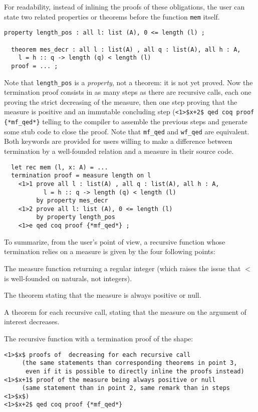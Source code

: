 For readability, instead of inlining the proofs of these obligations,
the user can state two related properties or theorems before the
function {\tt mem} itself.

\noindent
{\scriptsize
\begin{lstlisting}[frame=none]
  property length_pos : all l: list (A), 0 <= length (l) ;

  theorem mes_decr : all l : list(A) , all q : list(A), all h : A,
    l = h :: q -> length (q) < length (l)
  proof = ... ;
\end{lstlisting}
}

Note that {\tt length\_pos} is a {\em property}, not a theorem: it is not
yet proved.
Now the termination proof consists in as many steps as there are
recursive calls, each one proving the strict decreasing of the measure,
then one step proving that the measure is positive and an immutable
concluding step (\lstinline"<1>$x+2$ qed coq proof {*mf_qed*}" telling to the
compiler to assemble the previous steps and generate some stub code to close
the proof. Note that {\tt mf\_qed} and {\tt wf\_qed} are equivalent. Both
keywords are provided for users willing to make a difference between
termination by a well-founded relation and a measure in their source code.

\noindent
{\scriptsize
\begin{lstlisting}
  let rec mem (l, x: A) = ...
  termination proof = measure length on l
    <1>1 prove all l : list(A) , all q : list(A), all h : A,
           l = h :: q -> length (q) < length (l)
         by property mes_decr
    <1>2 prove all l: list (A), 0 <= length (l)
         by property length_pos
    <1>e qed coq proof {*mf_qed*} ;
\end{lstlisting}
}

To summarize, from the user's point of view, a recursive function
whose termination relies on a measure is given by the four following
points:
\begin{compact-enumerate}
\item The measure function returning a regular integer (which
  raises the issue that $<$ is well-founded on naturals, not integers).
\item The theorem stating that the measure is always positive or null.
\item A theorem for each recursive call, stating that the measure on the
  argument of interest decreases.
\item The recursive function with a termination proof of the shape:
  \noindent
  {\scriptsize
  \begin{lstlisting}[mathescape=true,frame=none]
<1>$x$ proofs of  decreasing for each recursive call
     (the same statements than corresponding theorems in point 3,
      even if it is possible to directly inline the proofs instead)
<1>$x+1$ proof of the measure being always positive or null
     (same statement than in point 2, same remark than in steps <1>$x$)
<1>$x+2$ qed coq proof {*mf_qed*}
  \end{lstlisting}
  }
\end{compact-enumerate}
